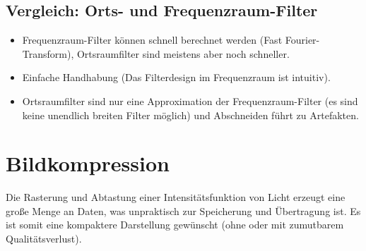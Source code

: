 		\subsection{Vergleich: Orts- und Frequenzraum-Filter}
			\begin{itemize}
				\item Frequenzraum-Filter können schnell berechnet werden (Fast Fourier-Transform), Ortsraumfilter sind meistens aber noch schneller.
				\item Einfache Handhabung (Das Filterdesign im Frequenzraum ist intuitiv).
				\item Ortsraumfilter sind nur eine Approximation der Frequenzraum-Filter (es sind keine unendlich breiten Filter möglich) und Abschneiden führt zu Artefakten.
			\end{itemize}

	\section{Bildkompression}
		Die Rasterung und Abtastung einer Intensitätsfunktion von Licht erzeugt eine große Menge an Daten, was unpraktisch zur Speicherung und Übertragung ist. Es ist somit eine kompaktere Darstellung gewünscht (ohne oder mit zumutbarem Qualitätsverlust).
		
